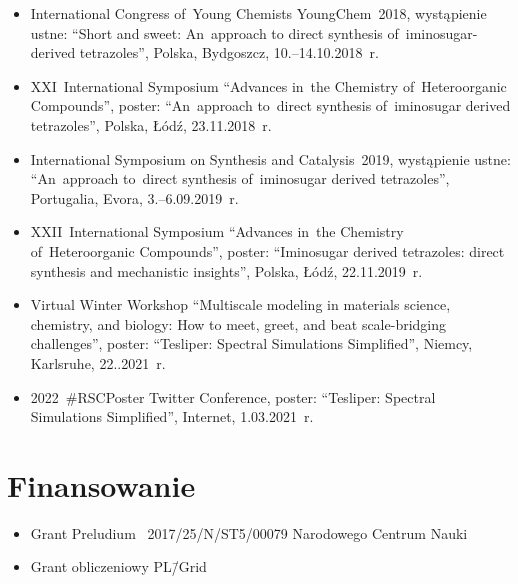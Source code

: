 \begin{fullwidth}
\begin{itemize}
  \item International Congress of~Young Chemists YoungChem~2018, wystąpienie ustne: \enquote{Short and sweet: An~approach to direct synthesis of~iminosugar-derived tetrazoles}, Polska, Bydgoszcz, 10.\-–14.10.2018~r.
  \item XXI~International Symposium \enquote{Advances in~the Chemistry of~Heteroorganic Compounds}, poster: \enquote{An~approach to~direct synthesis of~iminosugar derived tetrazoles}, Polska, Łódź, 23.11.2018~r.
  \item International Symposium on Synthesis and Catalysis~2019, wystąpienie ustne: \enquote{An~approach to~direct synthesis of~iminosugar derived tetrazoles}, Portugalia, Evora, 3.\-–6.09.2019~r.
  \item XXII~International Symposium \enquote{Advances in~the Chemistry of~Heteroorganic Compounds}, poster: \enquote{Iminosugar derived tetrazoles: direct synthesis and mechanistic insights}, Polska, Łódź, 22.11.2019~r.
  \item Virtual Winter Workshop \enquote{Multiscale modeling in materials science, chemistry, and biology: How to meet, greet, and beat scale-bridging challenges}, poster: \enquote{Tesliper: Spectral Simulations Simplified}, Niemcy, Karlsruhe, 22..2021~r.
  \item 2022~#RSCPoster Twitter Conference, poster: \enquote{Tesliper: Spectral Simulations Simplified}, Internet, 1.03.2021~r.
\end{itemize}
\end{fullwidth}

\section{Finansowanie}\label{intro:founding}
\begin{fullwidth}
\begin{itemize}
  \item Grant Preludium \textnumero~2017/25/N/ST5/00079 Narodowego Centrum Nauki
  \item Grant obliczeniowy PL\=/Grid
\end{itemize}
\end{fullwidth}

\begin{fullwidth}
  \printglossary[title=Wykaz skrótów, type=\acronymtype]
\end{fullwidth}
  